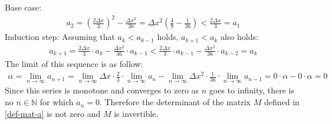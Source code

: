 Base case:
\begin{gather}
a_{2} = (\frac{2 \Delta x}{3})^{2} - \frac{\Delta x^{2}}{36} = \Delta x^{2} (\frac{4}{9} - \frac{1}{36}) < \frac{2 \Delta x}{3} = a_{1}
\end{gather}
Induction step: Assuming that \(a_k < a_{k-1}\) holds, \(a_{k+1} < a_{k}\) also holds:
\begin{gather}
a_{k+1} = \frac{2 \Delta x}{3} \cdot a_{k} - \frac{\Delta x^2}{36} \cdot a_{k-1}  < \frac{2 \Delta x}{3} \cdot a_{k-1} - \frac{\Delta x^2}{36} \cdot a_{k-2} = a_{k} 
\end{gather}
The limit of this sequence is as follow:
\begin{gather}
\alpha = \lim_{n \to \infty} a_{n+1} = \lim_{n \to \infty} \Delta x \cdot \frac{2}{3} \cdot \lim_{n \to \infty} a_{n} - \lim_{n \to \infty} \Delta x^{2} 
\cdot \frac{1}{36} \cdot \lim_{n \to \infty} a_{n-1} 
= 0 \cdot \alpha - 0 \cdot \alpha = 0
\end{gather}
Since this series is monotone and converges to zero as \(n\) goes to infinity, there is no \(n \in \mathbb{N}\) for which \(a_n = 0\). 
Therefore the determinant of the matrix \(M\) defined in \ref{def-mat-a} is not zero and \(M\) is invertible.





